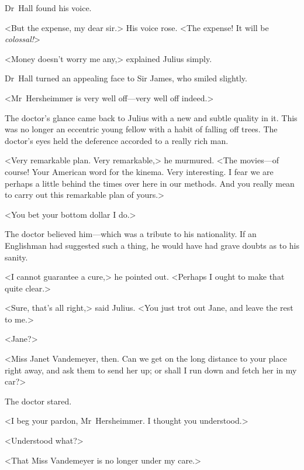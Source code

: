 Dr~Hall found his voice.

<But the expense, my dear sir.> His voice rose. <The expense! It will be \emph{colossal!}>

<Money doesn't worry me any,> explained Julius simply.

Dr~Hall turned an appealing face to Sir James, who smiled slightly.

<Mr~Hersheimmer is very well off—very well off indeed.>

The doctor's glance came back to Julius with a new and subtle quality in it. This was no longer an eccentric young fellow with a habit of falling off trees. The doctor's eyes held the deference accorded to a really rich man.

<Very remarkable plan. Very remarkable,> he murmured. <The movies—of course! Your American word for the kinema. Very interesting. I fear we are perhaps a little behind the times over here in our methods. And you really mean to carry out this remarkable plan of yours.>

<You bet your bottom dollar I do.>

The doctor believed him—which was a tribute to his nationality. If an Englishman had suggested such a thing, he would have had grave doubts as to his sanity.

<I cannot guarantee a cure,> he pointed out. <Perhaps I ought to make that quite clear.>

<Sure, that's all right,> said Julius. <You just trot out Jane, and leave the rest to me.>

<Jane?>

<Miss Janet Vandemeyer, then. Can we get on the long distance to your place right away, and ask them to send her up; or shall I run down and fetch her in my car?>

The doctor stared.

<I beg your pardon, Mr~Hersheimmer. I thought you understood.>

<Understood what?>

<That Miss Vandemeyer is no longer under my care.> 